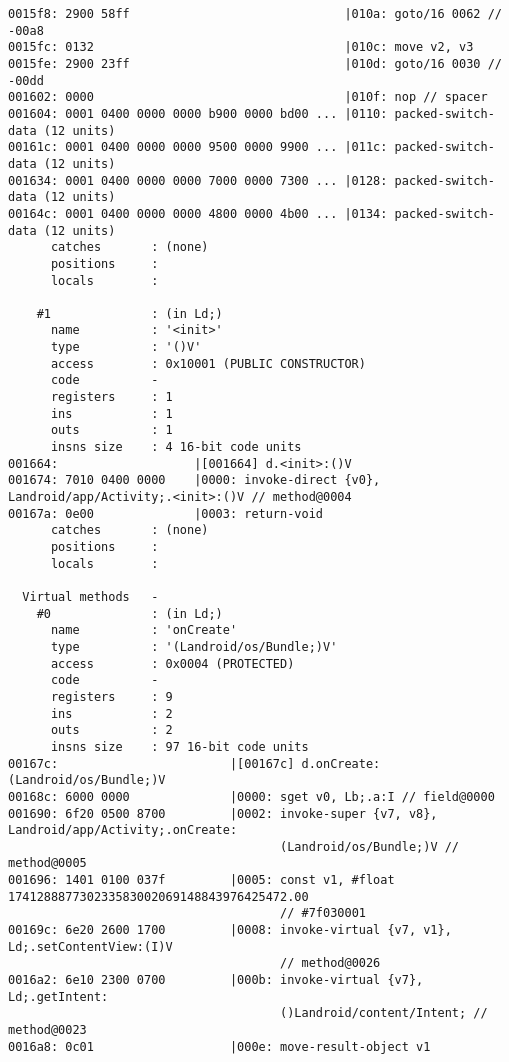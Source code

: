 \begin{lstlisting}
0015f8: 2900 58ff                              |010a: goto/16 0062 // -00a8
0015fc: 0132                                   |010c: move v2, v3
0015fe: 2900 23ff                              |010d: goto/16 0030 // -00dd
001602: 0000                                   |010f: nop // spacer
001604: 0001 0400 0000 0000 b900 0000 bd00 ... |0110: packed-switch-data (12 units)
00161c: 0001 0400 0000 0000 9500 0000 9900 ... |011c: packed-switch-data (12 units)
001634: 0001 0400 0000 0000 7000 0000 7300 ... |0128: packed-switch-data (12 units)
00164c: 0001 0400 0000 0000 4800 0000 4b00 ... |0134: packed-switch-data (12 units)
      catches       : (none)
      positions     :
      locals        :

    #1              : (in Ld;)
      name          : '<init>'
      type          : '()V'
      access        : 0x10001 (PUBLIC CONSTRUCTOR)
      code          -
      registers     : 1
      ins           : 1
      outs          : 1
      insns size    : 4 16-bit code units
001664:                   |[001664] d.<init>:()V
001674: 7010 0400 0000    |0000: invoke-direct {v0}, Landroid/app/Activity;.<init>:()V // method@0004
00167a: 0e00              |0003: return-void
      catches       : (none)
      positions     :
      locals        :

  Virtual methods   -
    #0              : (in Ld;)
      name          : 'onCreate'
      type          : '(Landroid/os/Bundle;)V'
      access        : 0x0004 (PROTECTED)
      code          -
      registers     : 9
      ins           : 2
      outs          : 2
      insns size    : 97 16-bit code units
00167c:                        |[00167c] d.onCreate:(Landroid/os/Bundle;)V
00168c: 6000 0000              |0000: sget v0, Lb;.a:I // field@0000
001690: 6f20 0500 8700         |0002: invoke-super {v7, v8}, Landroid/app/Activity;.onCreate:
                                      (Landroid/os/Bundle;)V // method@0005
001696: 1401 0100 037f         |0005: const v1, #float 174128887730233583002069148843976425472.00
                                      // #7f030001
00169c: 6e20 2600 1700         |0008: invoke-virtual {v7, v1}, Ld;.setContentView:(I)V
                                      // method@0026
0016a2: 6e10 2300 0700         |000b: invoke-virtual {v7}, Ld;.getIntent:
                                      ()Landroid/content/Intent; // method@0023
0016a8: 0c01                   |000e: move-result-object v1




\end{lstlisting}
